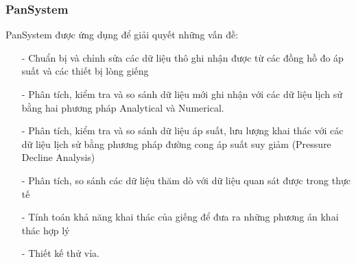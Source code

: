 \documentclass[12pt,a4paper]{report}
\begin{document}
	\subsubsection{PanSystem}
    PanSystem được ứng dụng để giải quyết những vấn đề:
    	\begin{itemize}
        	\item[-] Chuẩn bị và chỉnh sửa các dữ liệu thô ghi nhận được từ các đồng hồ đo áp suất và các thiết bị lòng giếng
            \item[-] Phân tích, kiểm tra và so sánh dữ liệu mới ghi nhận với các dữ liệu lịch sử bằng hai phương pháp Analytical và Numerical.
            \item[-] Phân tích, kiểm tra và so sánh dữ liệu áp suất, lưu lượng khai thác với các dữ liệu lịch sử bằng phương pháp đường cong áp suất suy giảm (Pressure Decline Analysis)
            \item[-] Phân tích, so sánh các dữ liệu thăm dò với dữ liệu quan sát được trong thực tế
            \item[-] Tính toán khả năng khai thác của giếng để đưa ra những phương án khai thác hợp lý
            \item[-] Thiết kế thử vỉa.
        \end{itemize}
        \newpage
\end{document}
